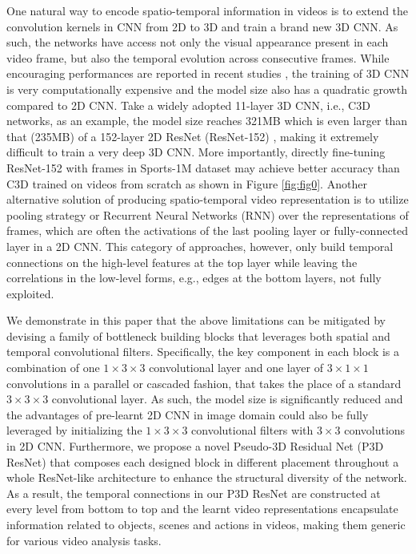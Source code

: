 \documentclass[10pt,twocolumn,letterpaper]{article}
\begin{document}
One natural way to encode spatio-temporal information in videos is to extend the convolution kernels in CNN from 2D to 3D and train a brand new 3D CNN. As such, the networks have access not only the visual appearance present in each video frame, but also the temporal evolution across consecutive frames. While encouraging performances are reported in recent studies \cite{Ji:PAMI13,tran2015learning,varol2016long}, the training of 3D CNN is very computationally expensive and the model size also has a quadratic growth compared to 2D CNN. Take a widely adopted 11-layer 3D CNN, i.e., C3D \cite{tran2015learning} networks, as an example, the model size reaches 321MB which is even larger than that (235MB) of a 152-layer 2D ResNet (ResNet-152) \cite{he2015deep}, making it extremely difficult to train a very deep 3D CNN. More importantly, directly fine-tuning ResNet-152 with frames in Sports-1M dataset \cite{karpathy2014large} may achieve better accuracy than C3D trained on videos from scratch as shown in Figure \ref{fig:fig0}. Another alternative solution of producing spatio-temporal video representation is to utilize pooling strategy or Recurrent Neural Networks (RNN) over the representations of frames, which are often the activations of the last pooling layer or fully-connected layer in a 2D CNN. This category of approaches, however, only build temporal connections on the high-level features at the top layer while leaving the correlations in the low-level forms, e.g., edges at the bottom layers, not fully exploited.


We demonstrate in this paper that the above limitations can be mitigated by devising a family of bottleneck building blocks that leverages both spatial and temporal convolutional filters. Specifically, the key component in each block is a combination of one $1\times3\times3$ convolutional layer and one layer of $3\times1\times1$ convolutions in a parallel or cascaded fashion, that takes the place of a standard $3\times3\times3$ convolutional layer. As such, the model size is significantly reduced and the advantages of pre-learnt 2D CNN in image domain could also be fully leveraged by initializing the $1\times3\times3$ convolutional filters with $3\times3$ convolutions in 2D CNN. Furthermore, we propose a novel Pseudo-3D Residual Net (P3D ResNet) that composes each designed block in different placement throughout a whole ResNet-like architecture to enhance the structural diversity of the network. As a result, the temporal connections in our P3D ResNet are constructed at every level from bottom to top and the learnt video representations encapsulate information related to objects, scenes and actions in videos, making them generic for various video analysis tasks.
\end{document}
